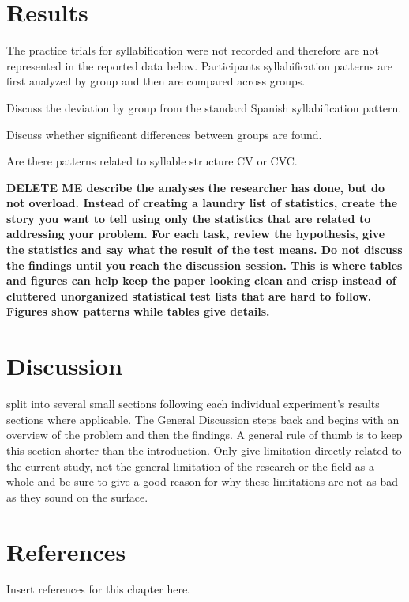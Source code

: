 \section{Results}

The practice trials for syllabification were not recorded and therefore are not represented in the reported data below. Participants syllabification patterns are first analyzed by group and then are compared across groups. 

Discuss the deviation by group from the standard Spanish syllabification pattern.

Discuss whether significant differences between groups are found.

Are there patterns related to syllable structure CV or CVC.

\textbf{DELETE ME describe the analyses the researcher has done, but do not overload. Instead of creating a laundry list of statistics, create the story you want to tell using only the statistics that are related to addressing your problem. 
For each task, review the hypothesis, give the statistics and say what the result of the test means. 
Do not discuss the findings until you reach the discussion session. 
This is where tables and figures can help keep the paper looking clean and crisp instead of cluttered unorganized statistical test lists that are hard to follow. 
Figures show patterns while tables give details.}


\section{Discussion}

split into several small sections following each individual experiment’s results sections where applicable. 
The General Discussion steps back and begins with an overview of the problem and then the findings. A general rule of thumb is to keep this section shorter than the introduction. Only give limitation directly related to the current study, not the general limitation of the research or the field as a whole and be sure to give a good reason for why these limitations are not as bad as they sound on the surface.



\section{References}

Insert references for this chapter here.









